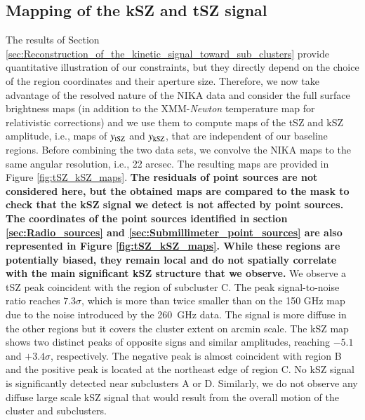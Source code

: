 \documentclass[twocolumn,traditabstract]{aa}
\begin{document}
\subsection{Mapping of the kSZ and tSZ signal}
The results of Section \ref{sec:Reconstruction_of_the_kinetic_signal_toward_sub_clusters} provide quantitative illustration of our constraints, but they directly depend on the choice of the region coordinates and their aperture size. Therefore, we now take advantage of the resolved nature of the NIKA data and consider the full surface brightness maps (in addition to the XMM-\textit{Newton} temperature map for relativistic corrections) and we use them to compute maps of the tSZ and kSZ amplitude, i.e., maps of $y_{\rm tSZ}$ and $y_{\rm kSZ}$, that are independent of our baseline regions. Before combining the two data sets, we convolve the NIKA maps to the same angular resolution, i.e., 22 arcsec. The resulting maps are provided in Figure \ref{fig:tSZ_kSZ_maps}. {\bf The residuals of point sources are not considered here, but the obtained maps are compared to the mask to check that the kSZ signal we detect is not affected by point sources. The coordinates of the point sources identified in section \ref{sec:Radio_sources} and \ref{sec:Submillimeter_point_sources} are also represented in Figure \ref{fig:tSZ_kSZ_maps}. While these regions are potentially biased, they remain local and do not spatially correlate with the main significant kSZ structure that we observe.} We observe a tSZ peak coincident with the region of subcluster C. The peak signal-to-noise ratio reaches $7.3 \sigma$, which is more than twice smaller than on the 150 GHz map due to the noise introduced by the 260~GHz data. The signal is more diffuse in the other regions but it covers the cluster extent on arcmin scale. The kSZ map shows two distinct peaks of opposite signs and similar amplitudes, reaching $-5.1$ and $+3.4 \sigma$, respectively. The negative peak is almost coincident with region B and the positive peak is located at the northeast edge of region C. No kSZ signal is significantly detected near subclusters A or D. Similarly, we do not observe any diffuse large scale kSZ signal that would result from the overall motion of the cluster and subclusters.
\end{document}
